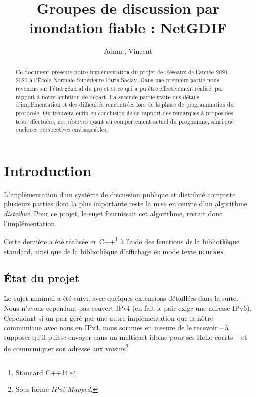 \documentclass[11pt,a4paper]{article}
\title{Groupes de discussion par inondation fiable : NetGDIF}
\author{Adam \bsc{Phillips}, Vincent \bsc{Bonczak}}
\begin{document}
  \maketitle
	
	\begin{abstract}
	Ce document présente notre implémentation du projet de Réseaux de l'année 2020-2021 à l'École Normale Supérieure Paris-Saclay. Dans une première partie
	nous revenons sur l'état général du projet et ce qui a pu être effectivement réalisé, par rapport à notre ambition de départ. La seconde partie traite 
	des détails d'implémentation et des difficultés rencontrées lors de la phase de programmation du protocole. On trouvera enfin en conclusion de ce rapport
	des remarques à propos des tests effectuées, nos réserves quant au comportement actuel du programme, ainsi que quelques perspectives envisageables.
	\end{abstract}
	
	
\section{Introduction}

L'implémentation d'un système de discussion publique et distribué comporte plusieurs parties dont la plus importante reste la mise en œuvre d'un algorithme \emph{distribué}. Pour ce projet, le sujet fournissait cet algorithme, restait donc l'implémentation.

Cette dernière a été réalisée en C++\footnote{Standard C++14.} à l'aide  des fonctions de la bibliothèque standard, ainsi que de la bibliothèque d'affichage en mode texte \texttt{ncurses}.

\subsection{État du projet}


Le sujet minimal a été suivi, avec quelques extensions détaillées dans la suite. Nous n'avons cependant pas couvert IPv4 (en fait le pair exige une adresse IPv6). Cependant si un pair géré par
une autre implémentation que la nôtre communique avec nous en IPv4, nous sommes en mesure de le recevoir -- à supposer qu'il puisse envoyer dans un multicast 
idoine pour ses Hello courts -- et de communiquer son adresse aux voisins\footnote{Sous forme \emph{IPv4-Mapped}.} 
\end{document}
